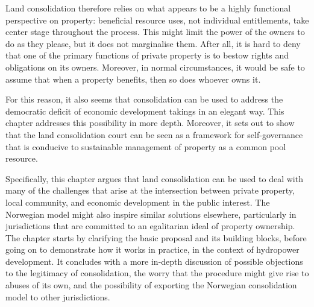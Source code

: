Land consolidation therefore relies on what appears to be a highly functional perspective on property: beneficial resource uses, not individual entitlements, take center stage throughout the process. This might limit the power of the owners to do as they please, but it does not marginalise them. After all, it is hard to deny that one of the primary functions of private property is to bestow rights and obligations on its owners. Moreover, in normal circumstances, it would be safe to assume that when a property benefits, then so does whoever owns it.

For this reason, it also seems that consolidation can be used to address the democratic deficit of economic development takings in an elegant way. This chapter addresses this possibility in more depth. Moreover, it sets out to show that the land consolidation court can be seen as a framework for self-governance that is conducive to sustainable management of property as a common pool resource. 




Specifically, this chapter argues that land consolidation can be used to deal with many of the challenges that arise at the intersection between private property, local community, and economic development in the public interest. The Norwegian model might also inspire similar solutions elsewhere, particularly in jurisdictions that are committed to an egalitarian ideal of property ownership. The chapter starts by clarifying the basic proposal and its building blocks, before going on to demonstrate how it works in practice, in the context of hydropower development. It concludes with a more in-depth discussion of possible objections to the legitimacy of consolidation, the worry that the procedure might give rise to abuses of its own, and the possibility of exporting the Norwegian consolidation model to other jurisdictions.

